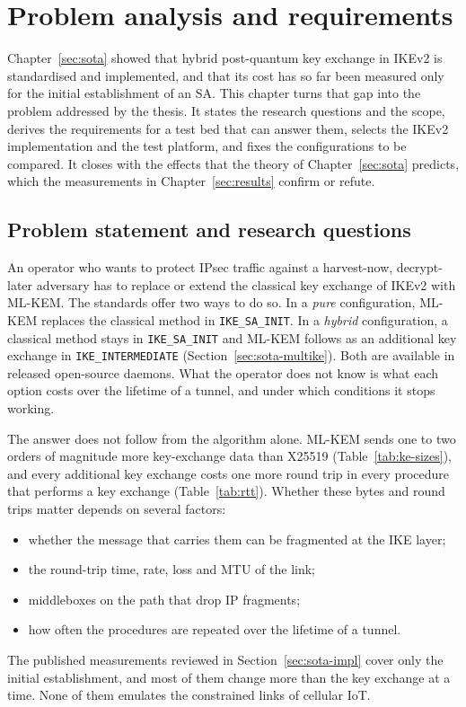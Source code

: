 \clearpage
\section{Problem analysis and requirements}
\label{sec:analysis}

Chapter~\ref{sec:sota} showed that hybrid post-quantum key exchange in IKEv2
is standardised and implemented, and that its cost has so far been measured
only for the initial establishment of an SA. This chapter turns that gap into
the problem addressed by the thesis. It states the research questions and the
scope, derives the requirements for a test bed that can answer them, selects
the IKEv2 implementation and the test platform, and fixes the configurations to
be compared. It closes with the effects that the theory of
Chapter~\ref{sec:sota} predicts, which the measurements in
Chapter~\ref{sec:results} confirm or refute.

\subsection{Problem statement and research questions}
\label{sec:analysis-problem}

An operator who wants to protect IPsec traffic against a harvest-now,
decrypt-later adversary has to replace or extend the classical key exchange
of IKEv2 with ML-KEM. The standards offer two ways to do so. In a \emph{pure}
configuration, ML-KEM replaces the classical method in \texttt{IKE\_SA\_INIT}.
In a \emph{hybrid} configuration, a classical method stays in
\texttt{IKE\_SA\_INIT} and ML-KEM follows as an additional key exchange in
\texttt{IKE\_INTERMEDIATE} (Section~\ref{sec:sota-multike}). Both are
available in released open-source daemons. What the operator does not know is
what each option costs over the lifetime of a tunnel, and under which
conditions it stops working.

The answer does not follow from the algorithm alone. ML-KEM sends one to two
orders of magnitude more key-exchange data than X25519
(Table~\ref{tab:ke-sizes}), and every additional key exchange costs one more
round trip in every procedure that performs a key exchange
(Table~\ref{tab:rtt}). Whether these bytes and round trips matter depends on
several factors:
\begin{itemize}
    \item whether the message that carries them can be fragmented at the IKE
    layer;
    \item the round-trip time, rate, loss and MTU of the link;
    \item middleboxes on the path that drop IP fragments;
    \item how often the procedures are repeated over the lifetime of
    a tunnel.
\end{itemize}
The published measurements reviewed in Section~\ref{sec:sota-impl} cover only
the initial establishment, and most of them change more than the key
exchange at a time. None of them emulates the constrained links of cellular
IoT.

